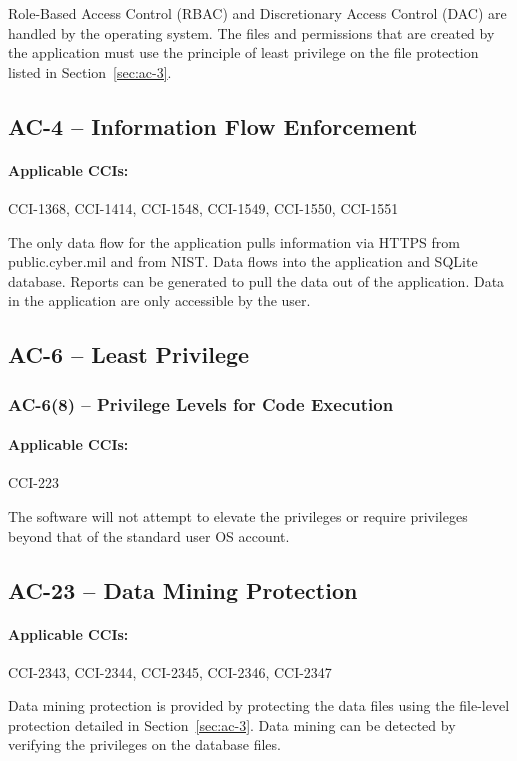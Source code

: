 \documentclass[letterpaper, 10pt, twoside]{article}
\begin{document}
Role-Based Access Control (RBAC) and Discretionary Access Control (DAC) are handled by the operating system. The files and permissions that are created by the application must use the principle of least privilege on the file protection listed in Section~\ref{sec:ac-3}.

\subsection{AC-4 -- Information Flow Enforcement}

\paragraph{Applicable CCIs:} CCI-1368, CCI-1414, CCI-1548, CCI-1549, CCI-1550, CCI-1551

The only data flow for the application pulls information via HTTPS from public.cyber.mil and from NIST. Data flows into the application and SQLite database. Reports can be generated to pull the data out of the application. Data in the application are only accessible by the user.

\subsection{AC-6 -- Least Privilege}

\subsubsection{AC-6(8) -- Privilege Levels for Code Execution}

\paragraph{Applicable CCIs:} CCI-223

The software will not attempt to elevate the privileges or require privileges beyond that of the standard user OS account.

\subsection{AC-23 -- Data Mining Protection}

\paragraph{Applicable CCIs:} CCI-2343, CCI-2344, CCI-2345, CCI-2346, CCI-2347

Data mining protection is provided by protecting the data files using the file-level protection detailed in Section~\ref{sec:ac-3}. Data mining can be detected by verifying the privileges on the database files.

\clearpage
\printbibliography
\end{document}
